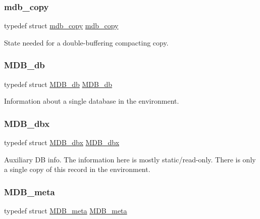 \subsubsection{\texorpdfstring{mdb\+\_\+copy}{mdb\_copy}}
{\footnotesize\ttfamily typedef struct \mbox{\hyperlink{structmdb__copy}{mdb\+\_\+copy}}  \mbox{\hyperlink{structmdb__copy}{mdb\+\_\+copy}}}

State needed for a double-\/buffering compacting copy. \mbox{\label{group__internal_ga58702e509a15e026f4a5c64d818011e4}} 
\subsubsection{\texorpdfstring{M\+D\+B\+\_\+db}{MDB\_db}}
{\footnotesize\ttfamily typedef struct \mbox{\hyperlink{struct_m_d_b__db}{M\+D\+B\+\_\+db}}  \mbox{\hyperlink{struct_m_d_b__db}{M\+D\+B\+\_\+db}}}

Information about a single database in the environment. \mbox{\label{group__internal_ga8d4f6f53db6f2935433429212467e0fa}} 
\subsubsection{\texorpdfstring{M\+D\+B\+\_\+dbx}{MDB\_dbx}}
{\footnotesize\ttfamily typedef struct \mbox{\hyperlink{struct_m_d_b__dbx}{M\+D\+B\+\_\+dbx}}  \mbox{\hyperlink{struct_m_d_b__dbx}{M\+D\+B\+\_\+dbx}}}

Auxiliary DB info. The information here is mostly static/read-\/only. There is only a single copy of this record in the environment. \mbox{\label{group__internal_gaaada41b50ed7a979eef130252feecb52}} 
\subsubsection{\texorpdfstring{M\+D\+B\+\_\+meta}{MDB\_meta}}
{\footnotesize\ttfamily typedef struct \mbox{\hyperlink{struct_m_d_b__meta}{M\+D\+B\+\_\+meta}}  \mbox{\hyperlink{struct_m_d_b__meta}{M\+D\+B\+\_\+meta}}}

